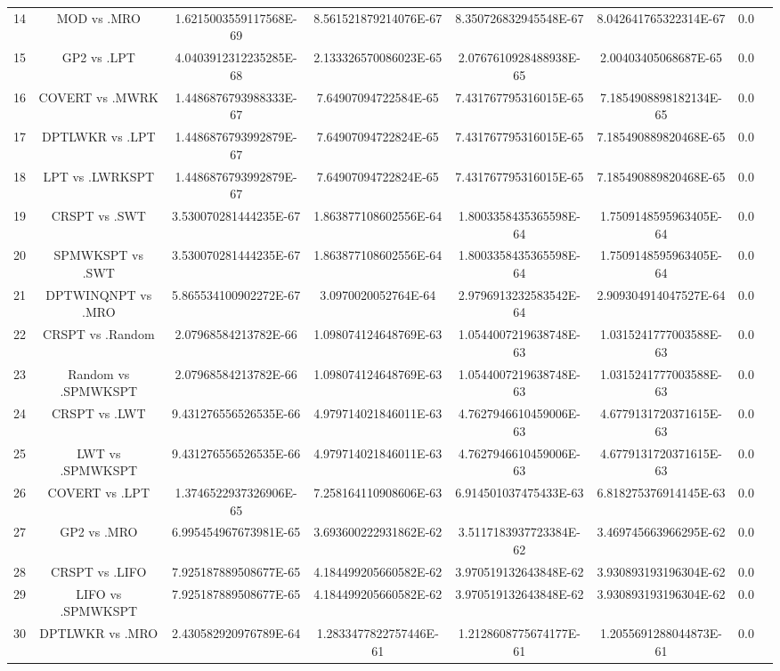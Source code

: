 \documentclass[a3paper,10pt]{article}
\begin{document}
\begin{table}[!htp]
\begin{tabular}{cccccccc}
14&MOD vs .MRO&1.6215003559117568E-69&8.561521879214076E-67&8.350726832945548E-67&8.042641765322314E-67&0.0\\
15&GP2 vs .LPT&4.0403912312235285E-68&2.133326570086023E-65&2.0767610928488938E-65&2.00403405068687E-65&0.0\\
16&COVERT vs .MWRK&1.4486876793988333E-67&7.64907094722584E-65&7.431767795316015E-65&7.1854908898182134E-65&0.0\\
17&DPTLWKR vs .LPT&1.4486876793992879E-67&7.64907094722824E-65&7.431767795316015E-65&7.185490889820468E-65&0.0\\
18&LPT vs .LWRKSPT&1.4486876793992879E-67&7.64907094722824E-65&7.431767795316015E-65&7.185490889820468E-65&0.0\\
19&CRSPT vs .SWT&3.530070281444235E-67&1.863877108602556E-64&1.8003358435365598E-64&1.7509148595963405E-64&0.0\\
20&SPMWKSPT vs .SWT&3.530070281444235E-67&1.863877108602556E-64&1.8003358435365598E-64&1.7509148595963405E-64&0.0\\
21&DPTWINQNPT vs .MRO&5.865534100902272E-67&3.0970020052764E-64&2.9796913232583542E-64&2.909304914047527E-64&0.0\\
22&CRSPT vs .Random&2.07968584213782E-66&1.098074124648769E-63&1.0544007219638748E-63&1.0315241777003588E-63&0.0\\
23&Random vs .SPMWKSPT&2.07968584213782E-66&1.098074124648769E-63&1.0544007219638748E-63&1.0315241777003588E-63&0.0\\
24&CRSPT vs .LWT&9.431276556526535E-66&4.979714021846011E-63&4.7627946610459006E-63&4.6779131720371615E-63&0.0\\
25&LWT vs .SPMWKSPT&9.431276556526535E-66&4.979714021846011E-63&4.7627946610459006E-63&4.6779131720371615E-63&0.0\\
26&COVERT vs .LPT&1.3746522937326906E-65&7.258164110908606E-63&6.914501037475433E-63&6.818275376914145E-63&0.0\\
27&GP2 vs .MRO&6.995454967673981E-65&3.693600222931862E-62&3.5117183937723384E-62&3.469745663966295E-62&0.0\\
28&CRSPT vs .LIFO&7.925187889508677E-65&4.184499205660582E-62&3.970519132643848E-62&3.930893193196304E-62&0.0\\
29&LIFO vs .SPMWKSPT&7.925187889508677E-65&4.184499205660582E-62&3.970519132643848E-62&3.930893193196304E-62&0.0\\
30&DPTLWKR vs .MRO&2.430582920976789E-64&1.2833477822757446E-61&1.2128608775674177E-61&1.2055691288044873E-61&0.0\\

\end{tabular}
\end{table}
\end{document}

